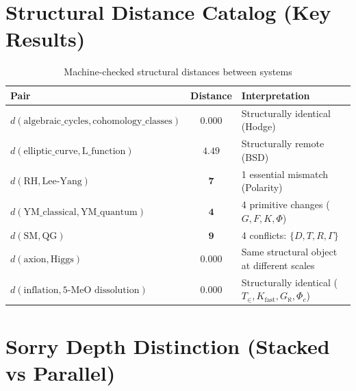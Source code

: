 \documentclass[11pt,a4paper]{article}
\begin{document}
\section{Structural Distance Catalog (Key Results)}

\begin{table}[h!]
\centering
\caption{Machine-checked structural distances between systems}
\label{tab:distances}
\begin{tabular}{l c l}
\toprule
\textbf{Pair} & \textbf{Distance} & \textbf{Interpretation} \\
\midrule
$d(\text{algebraic\_cycles}, \text{cohomology\_classes})$ & $\mathbf{0.000}$ & Structurally identical (Hodge) \\
$d(\text{elliptic\_curve}, \text{L\_function})$ & $\mathbf{4.49}$ & Structurally remote (BSD) \\
$d(\text{RH}, \text{Lee-Yang})$ & $\mathbf{7}$ & 1 essential mismatch (Polarity) \\
$d(\text{YM\_classical}, \text{YM\_quantum})$ & $\mathbf{4}$ & 4 primitive changes ($G,F,K,\Phi$) \\
$d(\text{SM}, \text{QG})$ & $\mathbf{9}$ & 4 conflicts: $\{D, T, R, \Gamma\}$ \\
$d(\text{axion}, \text{Higgs})$ & $\mathbf{0.000}$ & Same structural object at different scales \\
$d(\text{inflation}, \text{5-MeO dissolution})$ & $\mathbf{0.000}$ & Structurally identical ($T_\in, K_{\text{fast}}, G_{\aleph}, \Phi_c$) \\
\bottomrule
\end{tabular}
\end{table}

\section{Sorry Depth Distinction (Stacked vs Parallel)}
\end{document}
